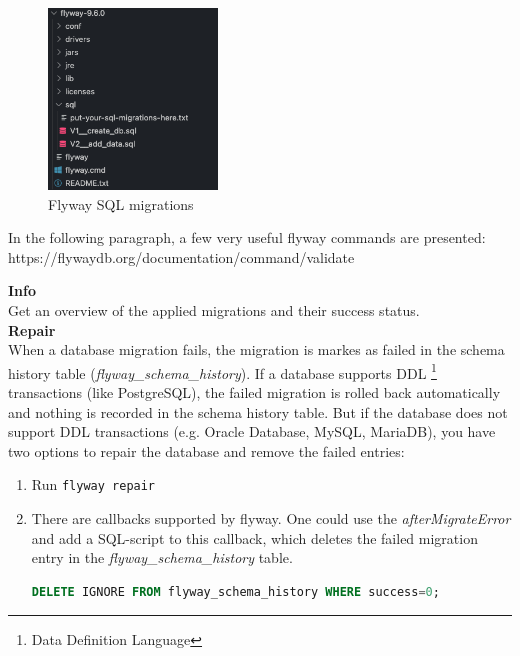 \begin{figure}[H]
	\centering
	\includegraphics[width=0.4\textwidth]{./chapters/intro_flyway/images/flyway_v2_sql_migrations}
	\caption[Flyway SQL migrations - Source: Own illustration]{Flyway SQL migrations}
	 \label{fig:flyway_sql_scripts}
\end{figure}



In the following paragraph, a few very useful flyway commands are presented:\\
https://flywaydb.org/documentation/command/validate

\textbf{Info}\\
Get an overview of the applied migrations and their success status.\\

\textbf{Repair}\\
When a database migration fails, the migration is markes as failed in the schema history table (\textit{flyway\_schema\_history}). If a database supports DDL \footnote{Data Definition Language} transactions (like PostgreSQL), the failed migration is rolled back automatically and nothing is recorded in the schema history table.  But if the database does not support DDL transactions (e.g. Oracle Database, MySQL, MariaDB), you have two options to repair the database and remove the failed entries:

\begin{enumerate}
	\item Run \texttt{flyway repair}\\
	\item There are callbacks supported by flyway. One could use the \textit{afterMigrateError} and add a SQL-script to this callback, which deletes the failed migration entry in the \textit{flyway\_schema\_history} table.
	
	\begin{lstlisting}[language=SQL]
	DELETE IGNORE FROM flyway_schema_history WHERE success=0;
	\end{lstlisting}
\end{enumerate}


